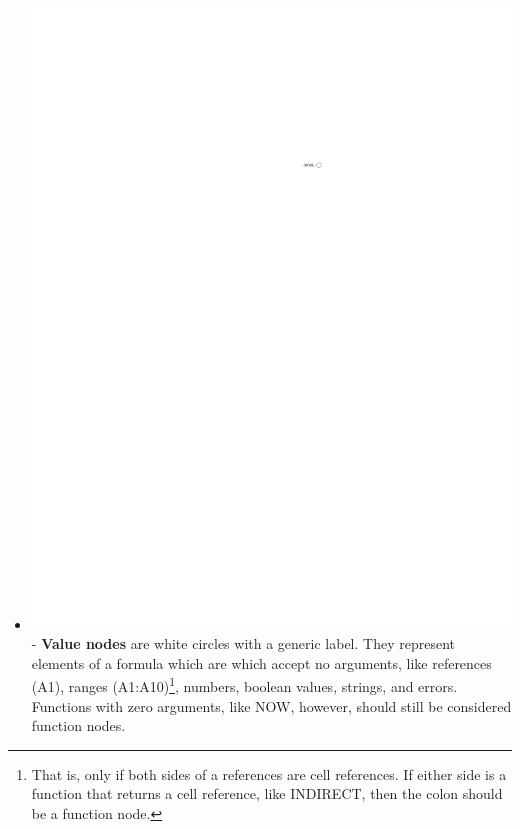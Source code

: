 \documentclass[conference]{IEEEtran}
\begin{document}
\begin{itemize}
		\item \vspace{.25cm}\includegraphics{glossary-leaf} - \textbf{Value nodes} are
		white circles with a generic label. They represent elements of a formula which
		are which accept no arguments, like references (A1), ranges
		(A1:A10)\footnote{That is, only if both sides of a references are cell
			references. If either side is a function that returns a cell reference, like
			INDIRECT, then the colon should be a function node.}, numbers, boolean values,
		strings, and errors. Functions with zero arguments, like NOW, however, should
		still be considered function nodes.
		

\end{itemize}
\end{document}
